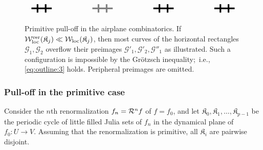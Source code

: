 \documentclass{amsart}
\newcommand{\filled}{{\mathfrak K }}
\newcommand{\1}{{\mathbb 1 }}
\newcommand{\FamG}{{\mathcal G}}
\newcommand{\Width}{{\mathcal W}}
\begin{document}
\begin{figure}[t!]
\[\begin{tikzpicture}[]
\begin{scope}[shift={(0,-3)}]
\begin{scope}[rotate =0]
\draw[line width=0.8mm] (-0.5,0)--(0.5,0); 
\draw[line width=0.8mm] (-0.2,-0.2)--(-0.2,0.2);
\draw[line width=0.8mm] (0.2,-0.2)--(0.2,0.2);
  \end{scope}



\begin{scope}[shift={(3,0)},gray]
\draw[line width=0.8mm] (-0.5,0)--(0.5,0); 
\draw[line width=0.8mm] (-0.2,-0.2)--(-0.2,0.2);
\draw[line width=0.8mm] (0.2,-0.2)--(0.2,0.2);
  \end{scope}

\begin{scope}[shift={(6,0)}]
\draw[line width=0.8mm] (-0.5,0)--(0.5,0); 
\draw[line width=0.8mm] (-0.2,-0.2)--(-0.2,0.2);
\draw[line width=0.8mm] (0.2,-0.2)--(0.2,0.2);
  \end{scope}
  
  \begin{scope}[shift={(9,0)}]
\draw[line width=0.8mm] (-0.5,0)--(0.5,0); 
\draw[line width=0.8mm] (-0.2,-0.2)--(-0.2,0.2);
\draw[line width=0.8mm] (0.2,-0.2)--(0.2,0.2);
  \end{scope}

\end{scope}
\end{tikzpicture}\]


\caption{Primitive pull-off in the airplane combinatorics. If $\Width_\loc^\ver(\filled_j) \ll \Width_\loc(\filled_j)$, then most curves of the horizontal rectangles $\FamG_1,\FamG_2$ overflow their preimages $\FamG'_1,\FamG'_2,\FamG''_1$ as illustrated. Such a configuration is impossible by the Gr\"otzsch inequality;~i.e., \eqref{eq:outline:3} holds. Peripheral preimages are omitted.}
\label{Fg:Pull off:Air Comb}
\end{figure}
\subsubsection{Pull-off in the primitive case \cite{K,covering lemma}}
\label{sss:intro:PrimPullOff}
Consider the $n$th renormalization $f_n={\mathcal R}^n f$ of $f=f_0$, and let $\filled_0, \filled_1,\dots ,\filled_{p-1}$ be the periodic cycle of little filled Julia sets of $f_n$ in the dynamical plane of $f_0\colon U\to V$. Assuming that the renormalization is primitive, all $\filled_i$ are pairwise disjoint.
\end{document}
